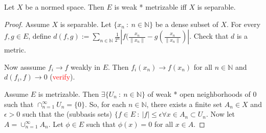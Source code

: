 \begin{theorem}
  Let $X$ be a normed space. Then $E$ is weak * metrizable iff $X$ is separable.
\end{theorem}
\begin{proof}
  Assume $X$ is separable. Let $\{ x_n  \ : \  n \in \mathbb{N} \}$
  be a dense subset of $X$. For every $f, g \in E$, define $d(f, g)
  := \sum_{n \in \mathbb{N}}  \frac{1}{2^n}|f( \frac{x_n}{\|x_n\|} -
    g( \frac{x_n}{\|x_n\|} )|$. Check that $d$ is a metric.

    Now asssume $f_i \to f$ weakly in $E$. Then $f_i(x_n) \to f(x_n)$
    for all $n \in \mathbb{N}$ and $d(f_i, f) \to 0$ (\textcolor{red}{verify}).

    Assume $E$ is metrizable. Then $\exists \{ U_n \ : \ n \in
    \mathbb{N} \}$ of weak * open neighborhoods of $0$ such that
    $\cap_{n = 1}^{\infty}U_n = \{ 0 \}$. So, for each $ n \in
    \mathbb{N}$, there exists a finite set $ A_n \in X$ and $\epsilon
    > 0$ such that the (subbasis sets) $\{ f \in E \ : \ |f|\le
      \epsilon \forall x \in A_n  \subset U_n$. Now let $A = \cup_{n
      = 1}^{\infty}A_n$. Let $\phi \in E$ such that $\phi(x) = 0$ for
      all $x \in A$.
    \end{proof}

